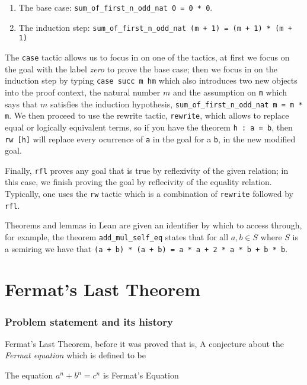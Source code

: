 \begin{example}
    \begin{enumerate}
        \item The base case: \texttt{sum\_of\_first\_n\_odd\_nat 0 = 0 * 0}.
        \item The induction step: \texttt{sum\_of\_first\_n\_odd\_nat (m + 1) = (m + 1) * (m + 1)}
    \end{enumerate}

    The \texttt{case} tactic allows us to focus in on one of the tactics, at first we focus on the goal with the label \textit{zero} to prove the base case;
    then we focus in on the induction step by typing \texttt{case succ m hm} which also introduces two new objects into the proof context, the natural number $m$ and the assumption
    on \texttt{m} which says that $m$ satisfies the induction hypothesis, \texttt{sum\_of\_first\_n\_odd\_nat m = m * m}. We then proceed to use the rewrite tactic, \texttt{rewrite},
    which allows to replace equal or logically equivalent terms, so if you have the theorem \texttt{h : a = b}, then \texttt{rw [h]} will replace every ocurrence of \texttt{a} in the goal
    for a \texttt{b}, in the new modified goal.

    Finally, \texttt{rfl} proves any goal that is true by reflexivity of the given relation; in this case, we finish proving the goal by reflecivity of the equality relation. Typically, one
    uses the \texttt{rw} tactic which is a combination of \texttt{rewrite} followed by \texttt{rfl}.

    Theorems and lemmas in Lean are given an identifier by which to access through, for example, the theorem \texttt{add\_mul\_self\_eq} states that for all $a, b \in S$ where $S$ is a semiring
    we have that \texttt{(a + b) * (a + b) = a * a + 2 * a * b + b * b}.
\end{example}


\section{Fermat's Last Theorem}


\subsubsection{Problem statement and its history}
Fermat's Last Theorem, before it was proved that is, A conjecture about the \textit{Fermat equation} which is defined to be

\begin{definition}
    The equation $a^n + b^n = c^n$ is Fermat's Equation
\end{definition}

